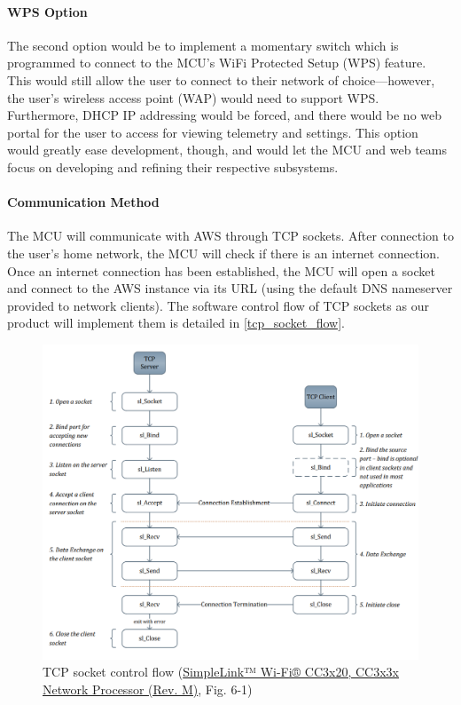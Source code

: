 \paragraph{WPS Option}
The second option would be to implement a momentary switch which is
programmed to connect to the MCU's WiFi Protected Setup (WPS) feature.
This would still allow the user to connect to their network of
choice---however, the user's wireless access point (WAP) would need to
support WPS. Furthermore, DHCP IP addressing would be forced, and there
would be no web portal for the user to access for viewing telemetry and
settings. This option would greatly ease development, though, and would
let the MCU and web teams focus on developing and refining their
respective subsystems.

\paragraph{Communication Method}
The MCU will communicate with AWS through TCP sockets. After connection to
the user's home network, the MCU will check if there is an internet
connection. Once an internet connection has been established, the MCU will
open a socket and connect to the AWS instance via its URL (using the
default DNS nameserver provided to network clients). The software control
flow of TCP sockets as our product will implement them is detailed in
\autoref{tcp_socket_flow}.
\begin{figure}[H]
    \caption{TCP socket control flow (\href{https://www.ti.com/lit/ds/symlink/cc3220s.pdf}{SimpleLink™ Wi-Fi® CC3x20, CC3x3x Network Processor (Rev. M)}, Fig. 6-1)}
    \label{tcp_socket_flow}
    \centering
    \includegraphics[width=\textwidth]{images/tcp_socket_flow.png}
\end{figure}

